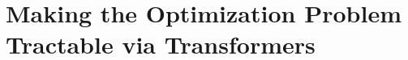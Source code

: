 \documentclass{article}
\newcommand{\energy}{{E}}
\newcommand{\nsamples}{{n}}
\begin{document}





\section{Making the Optimization Problem Tractable via Transformers}\label{sec:optimization-problem}
\end{document}
